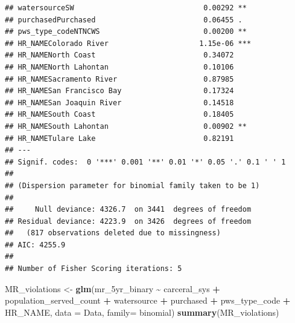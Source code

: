 \documentclass[
]{article}
\newenvironment{Shaded}{\begin{snugshade}}{\end{snugshade}}
\newcommand{\AttributeTok}[1]{\textcolor[rgb]{0.13,0.29,0.53}{#1}}
\newcommand{\FunctionTok}[1]{\textcolor[rgb]{0.13,0.29,0.53}{\textbf{#1}}}
\newcommand{\NormalTok}[1]{#1}
\newcommand{\OtherTok}[1]{\textcolor[rgb]{0.56,0.35,0.01}{#1}}
\newcommand{\SpecialCharTok}[1]{\textcolor[rgb]{0.81,0.36,0.00}{\textbf{#1}}}
\begin{document}
\begin{verbatim}
## watersourceSW                              0.00292 ** 
## purchasedPurchased                         0.06455 .  
## pws_type_codeNTNCWS                        0.00200 ** 
## HR_NAMEColorado River                     1.15e-06 ***
## HR_NAMENorth Coast                         0.34072    
## HR_NAMENorth Lahontan                      0.10106    
## HR_NAMESacramento River                    0.87985    
## HR_NAMESan Francisco Bay                   0.17324    
## HR_NAMESan Joaquin River                   0.14518    
## HR_NAMESouth Coast                         0.18405    
## HR_NAMESouth Lahontan                      0.00902 ** 
## HR_NAMETulare Lake                         0.82191    
## ---
## Signif. codes:  0 '***' 0.001 '**' 0.01 '*' 0.05 '.' 0.1 ' ' 1
## 
## (Dispersion parameter for binomial family taken to be 1)
## 
##     Null deviance: 4326.7  on 3441  degrees of freedom
## Residual deviance: 4223.9  on 3426  degrees of freedom
##   (817 observations deleted due to missingness)
## AIC: 4255.9
## 
## Number of Fisher Scoring iterations: 5
\end{verbatim}

\begin{Shaded}
\begin{Highlighting}[]
\NormalTok{MR\_violations }\OtherTok{\textless{}{-}} \FunctionTok{glm}\NormalTok{(mr\_5yr\_binary }\SpecialCharTok{\textasciitilde{}}\NormalTok{ carceral\_sys }\SpecialCharTok{+}\NormalTok{ population\_served\_count }\SpecialCharTok{+}\NormalTok{ watersource }\SpecialCharTok{+}\NormalTok{ purchased }\SpecialCharTok{+}\NormalTok{ pws\_type\_code }\SpecialCharTok{+}\NormalTok{ HR\_NAME, }\AttributeTok{data =}\NormalTok{ Data, }\AttributeTok{family=}\NormalTok{ binomial)}
\FunctionTok{summary}\NormalTok{(MR\_violations)}
\end{Highlighting}
\end{Shaded}
\end{document}
